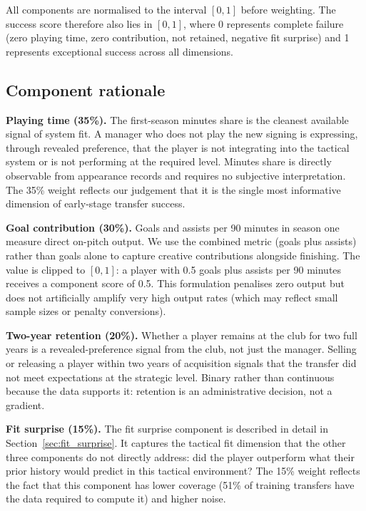 \documentclass[12pt, a4paper, oneside]{report}
\begin{document}
All components are normalised to the interval $[0, 1]$ before weighting. The success score therefore also lies in $[0, 1]$, where 0 represents complete failure (zero playing time, zero contribution, not retained, negative fit surprise) and 1 represents exceptional success across all dimensions.

\subsection{Component rationale}

\textbf{Playing time (35\%).} The first-season minutes share is the cleanest available signal of system fit. A manager who does not play the new signing is expressing, through revealed preference, that the player is not integrating into the tactical system or is not performing at the required level. Minutes share is directly observable from appearance records and requires no subjective interpretation. The 35\% weight reflects our judgement that it is the single most informative dimension of early-stage transfer success.

\textbf{Goal contribution (30\%).} Goals and assists per 90 minutes in season one measure direct on-pitch output. We use the combined metric (goals plus assists) rather than goals alone to capture creative contributions alongside finishing. The value is clipped to $[0, 1]$: a player with 0.5 goals plus assists per 90 minutes receives a component score of 0.5. This formulation penalises zero output but does not artificially amplify very high output rates (which may reflect small sample sizes or penalty conversions).

\textbf{Two-year retention (20\%).} Whether a player remains at the club for two full years is a revealed-preference signal from the club, not just the manager. Selling or releasing a player within two years of acquisition signals that the transfer did not meet expectations at the strategic level. Binary rather than continuous because the data supports it: retention is an administrative decision, not a gradient.

\textbf{Fit surprise (15\%).} The fit surprise component is described in detail in Section~\ref{sec:fit_surprise}. It captures the tactical fit dimension that the other three components do not directly address: did the player outperform what their prior history would predict in this tactical environment? The 15\% weight reflects the fact that this component has lower coverage (51\% of training transfers have the data required to compute it) and higher noise.
\end{document}
